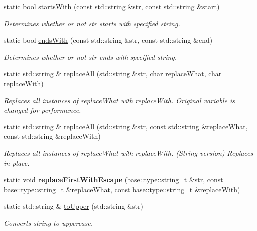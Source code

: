 \begin{DoxyCompactItemize}
static bool \hyperlink{classel_1_1base_1_1utils_1_1_str_acf80221cec72da701ef50995a61ab91f}{starts\+With} (const std\+::string \&str, const std\+::string \&start)
\begin{DoxyCompactList}\small\item\em Determines whether or not str starts with specified string. \end{DoxyCompactList}\item 
static bool \hyperlink{classel_1_1base_1_1utils_1_1_str_a5bcf5f6cc41a7ed683be115148579561}{ends\+With} (const std\+::string \&str, const std\+::string \&end)
\begin{DoxyCompactList}\small\item\em Determines whether or not str ends with specified string. \end{DoxyCompactList}\item 
static std\+::string \& \hyperlink{classel_1_1base_1_1utils_1_1_str_aa07bfda259ed194120b371401734ae86}{replace\+All} (std\+::string \&str, char replace\+What, char replace\+With)
\begin{DoxyCompactList}\small\item\em Replaces all instances of replace\+What with \textquotesingle{}replace\+With\textquotesingle{}. Original variable is changed for performance. \end{DoxyCompactList}\item 
static std\+::string \& \hyperlink{classel_1_1base_1_1utils_1_1_str_a8e823aa60b160451ca0b8732c3c75568}{replace\+All} (std\+::string \&str, const std\+::string \&replace\+What, const std\+::string \&replace\+With)
\begin{DoxyCompactList}\small\item\em Replaces all instances of \textquotesingle{}replace\+What\textquotesingle{} with \textquotesingle{}replace\+With\textquotesingle{}. (String version) Replaces in place. \end{DoxyCompactList}\item 
\mbox{\label{classel_1_1base_1_1utils_1_1_str_a3725349f601d07316d1c2bc211daaaa1}} 
static void {\bfseries replace\+First\+With\+Escape} (base\+::type\+::string\+\_\+t \&str, const base\+::type\+::string\+\_\+t \&replace\+What, const base\+::type\+::string\+\_\+t \&replace\+With)
\item 
static std\+::string \& \hyperlink{classel_1_1base_1_1utils_1_1_str_a6a05315fb967508dc1faf0584421a95d}{to\+Upper} (std\+::string \&str)
\begin{DoxyCompactList}\small\item\em Converts string to uppercase. \end{DoxyCompactList}\item 

\end{DoxyCompactItemize}
